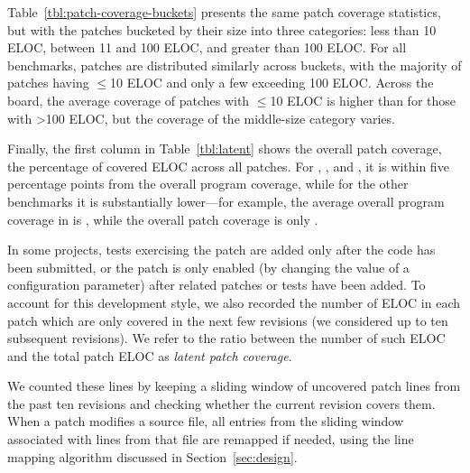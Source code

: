 Table~\ref{tbl:patch-coverage-buckets} presents the same patch
coverage statistics, but with the patches bucketed by their size into
three categories: less than 10 ELOC, between 11 and 100 ELOC, and
greater than 100 ELOC.  For all benchmarks, patches are distributed
similarly across buckets, with the majority of patches having $\le$10
ELOC and only a few exceeding 100 ELOC.  Across the board, the average
coverage of patches with $\le$10 ELOC is higher than for those with
\textgreater100 ELOC, but the coverage of the middle-size category varies.

Finally, the first column in Table~\ref{tbl:latent} shows the overall
patch coverage, \ie the percentage of covered ELOC across all
patches.  For \beanstalkd, \binutils, \git and \memcached, it is within five
percentage points from the overall program coverage, while for the
other benchmarks it is substantially lower---for example, the average
overall program coverage in \redis is \redisCoverageAverage, while the
overall patch coverage is only \redisOverallPatchCoverage.



\begin{question}
  \rqseven
\end{question}

In some projects, tests exercising the patch are added only after the
code has been submitted, or the patch is only enabled (\eg by changing
the value of a configuration parameter) after related patches or tests
have been added.  To account for this development style, we also
recorded the number of ELOC in each patch which are only covered in
the next few revisions (we considered up to ten subsequent revisions).
We refer to the ratio between the number of such ELOC and the total
patch ELOC as \textit{latent patch coverage}.

We counted these lines by keeping a sliding window of uncovered
patch lines from the past ten revisions and checking whether the
current revision covers them.  When a patch modifies a
source file, all entries from the sliding window associated with lines
from that file are remapped if needed, using the line mapping algorithm
discussed in Section~\ref{sec:design}.

